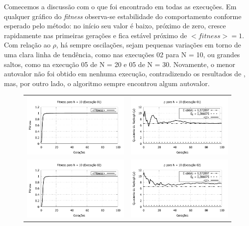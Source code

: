 	Comecemos a discussão com o que foi encontrado em todas as execuções. Em qualquer gráfico do \textit{fitness} observa-se estabilidade do comportamento conforme esperado pelo método: no início seu valor é baixo, próximo de zero, cresce rapidamente nas primeiras gerações e fica estável próximo de $<fitness> = 1$. Com relação ao $\rho$, há sempre oscilações, sejam pequenas variações em torno de uma clara linha de tendência, como nas execuções 02 para N = 10, ou grandes saltos, como na execução 05 de N = 20 e 05 de N = 30. Novamente, o menor autovalor não foi obtido em nenhuma execução, contradizendo os resultados de \cite{metodo2004}, mas, por outro lado, o algoritmo sempre encontrou algum autovalor.

\newpage	
\begin{figure}[phtb]
\centering
  \begin{tabular}{@{}cc@{}}
    \includegraphics[width=.40\textwidth]{figs/resultados/N10_01_fitness.pdf} &
    \includegraphics[width=.40\textwidth]{figs/resultados/N10_01_rho.pdf}   \\
		\includegraphics[width=.40\textwidth]{figs/resultados/N10_02_fitness.pdf} &
    \includegraphics[width=.40\textwidth]{figs/resultados/N10_02_rho.pdf}   \\

\end{tabular}
\end{figure}
